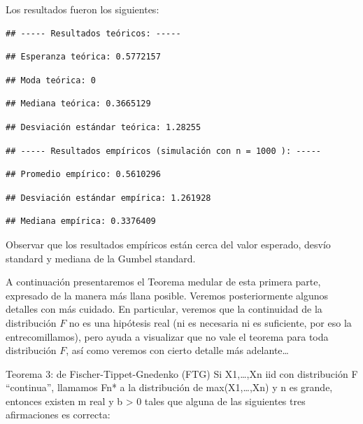 \documentclass[
]{book}
\theoremstyle{definition}
\theoremstyle{definition}
\theoremstyle{definition}
\theoremstyle{definition}
\theoremstyle{remark}
\begin{document}
Los resultados fueron los siguientes:

\begin{verbatim}
## ----- Resultados teóricos: -----
\end{verbatim}

\begin{verbatim}
## Esperanza teórica: 0.5772157
\end{verbatim}

\begin{verbatim}
## Moda teórica: 0
\end{verbatim}

\begin{verbatim}
## Mediana teórica: 0.3665129
\end{verbatim}

\begin{verbatim}
## Desviación estándar teórica: 1.28255
\end{verbatim}

\begin{verbatim}
## ----- Resultados empíricos (simulación con n = 1000 ): -----
\end{verbatim}

\begin{verbatim}
## Promedio empírico: 0.5610296
\end{verbatim}

\begin{verbatim}
## Desviación estándar empírica: 1.261928
\end{verbatim}

\begin{verbatim}
## Mediana empírica: 0.3376409
\end{verbatim}

Observar que los resultados empíricos están cerca del valor esperado, desvío standard y mediana de la Gumbel standard.

A continuación presentaremos el Teorema medular de esta primera parte, expresado de la manera más llana posible. Veremos posteriormente algunos detalles con más cuidado. En particular, veremos que la continuidad de la distribución \(F\) no
es una hipótesis real (ni es necesaria ni es suficiente, por eso la
entrecomillamos), pero ayuda a visualizar que no vale el teorema para toda distribución \(F\), así como veremos con cierto detalle más adelante\ldots{}

Teorema 3: de Fischer-Tippet-Gnedenko (FTG)
Si X1,\ldots,Xn iid con distribución F ``continua'',
llamamos Fn* a la distribución de max(X1,\ldots,Xn) y n
es grande, entonces existen m real y b \textgreater{} 0 tales que
alguna de las siguientes tres afirmaciones es
correcta:
\end{document}
